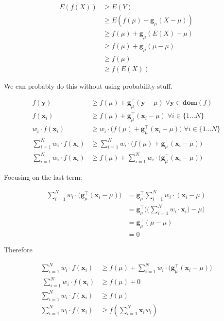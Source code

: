 \documentclass{article}
\begin{document}
		\begin{align}
			E(f(X)) &\ge E(Y)\\
			&\ge E(f(\mu) + \mathbf{g}_\mu (X-\mu))\\
			&\ge f(\mu) + \mathbf{g}_\mu (E(X)-\mu)\\
			&\ge f(\mu) + \mathbf{g}_\mu (\mu-\mu)\\
			&\ge f(\mu) \\
			&\ge f(E(X)) 
		\end{align}
		
		We can probably do this without using probability stuff.
		
		\begin{align}
			f(\mathbf{y}) &\ge f(\mu) + \mathbf{g}^\top_\mu (\mathbf{y}-\mu)\; \forall\mathbf{y}\in\mathbf{dom}(f)\\
			f(\mathbf{x}_i) &\ge f(\mu) + \mathbf{g}^\top_\mu (\mathbf{x}_i-\mu)\; \forall i\in\{ 1\ldots N\}\\
			w_i\cdot f(\mathbf{x}_i) &\ge w_i\cdot \big(f(\mu) + \mathbf{g}^\top_\mu (\mathbf{x}_i-\mu)\big)\; \forall i\in\{ 1\ldots N\}		\\
			\sum^N_{i=1}w_i\cdot f(\mathbf{x}_i) &\ge \sum^N_{i=1}w_i\cdot \big(f(\mu) + \mathbf{g}^\top_\mu (\mathbf{x}_i-\mu)\big)\\
			\sum^N_{i=1}w_i\cdot f(\mathbf{x}_i) & \ge f(\mu)  + \sum^N_{i=1}w_i\cdot \big(\mathbf{g}^\top_\mu (\mathbf{x}_i-\mu)\big)\
		\end{align}
		
		Focusing on the last term:
		
		\begin{align}
			\sum^N_{i=1}w_i\cdot \big(\mathbf{g}^\top_\mu (\mathbf{x}_i-\mu)\big) &= \mathbf{g}^\top_\mu \sum^N_{i=1}w_i\cdot (\mathbf{x}_i-\mu)\\
			&= \mathbf{g}^\top_\mu \bigg( \bigg(\sum^N_{i=1}w_i\cdot \mathbf{x}_i\bigg)-\mu \bigg)\\
			&= \mathbf{g}^\top_\mu (\mu -\mu )\\
			&= 0
		\end{align}
		
		
		Therefore
		
		\begin{align}
			\sum^N_{i=1}w_i\cdot f(\mathbf{x}_i) & \ge f(\mu)  + \sum^N_{i=1}w_i\cdot \big(\mathbf{g}^\top_\mu (\mathbf{x}_i-\mu)\big)\\\
			\sum^N_{i=1}w_i\cdot f(\mathbf{x}_i) & \ge f(\mu)  + 0\\
			\sum^N_{i=1}w_i\cdot f(\mathbf{x}_i) & \ge f(\mu)\\
			\sum^N_{i=1}w_i\cdot f(\mathbf{x}_i) & \ge f(\sum^N_{i=1} \mathbf{x}_i w_i)
		\end{align}
		
\end{document}
